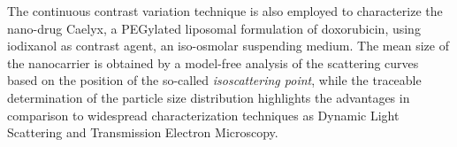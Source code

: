  

The continuous contrast variation technique is also employed to characterize the nano-drug Caelyx, a PEGylated liposomal formulation of doxorubicin, using iodixanol as contrast agent, an iso-osmolar suspending medium. The mean size of the nanocarrier is obtained by a model-free analysis of the scattering curves based on the position of the so-called \emph{isoscattering point}, while the traceable determination of the particle size distribution highlights the advantages in comparison to widespread characterization techniques as Dynamic Light Scattering and Transmission Electron Microscopy.





